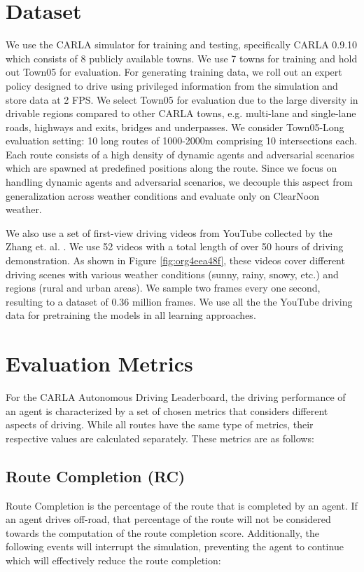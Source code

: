 \documentclass[letterpaper, 12pt]{book}
\theoremstyle{definition}
\theoremstyle{definition}
\theoremstyle{definition}
\theoremstyle{definition}
\theoremstyle{definition}
\begin{document}
\section{Dataset \label{org2f244fb}}
\label{sec:org3dcf138}
We use the CARLA \cite{Dosovitskiy2017} simulator for training and testing,
specifically CARLA 0.9.10 which consists of 8 publicly available towns. We use 7
towns for training and hold out Town05 for evaluation. For generating training
data, we roll out an expert policy designed to drive using privileged
information from the simulation and store data at 2 FPS. We select Town05 for
evaluation due to the large diversity in drivable regions compared to other
CARLA towns, e.g. multi-lane and single-lane roads, highways and exits, bridges
and underpasses. We consider Town05-Long evaluation setting: 10 long routes of
1000-2000m comprising 10 intersections each. Each route consists of a high
density of dynamic agents and adversarial scenarios which are spawned at
predefined positions along the route. Since we focus on handling dynamic agents
and adversarial scenarios, we decouple this aspect from generalization across
weather conditions and evaluate only on ClearNoon weather.

We also use a set of first-view driving videos from YouTube collected by the
Zhang et. al. \cite{Zhang2022}. We use 52 videos with a total length of over 50
hours of driving demonstration. As shown in Figure \ref{fig:org4eea48f}, these videos
cover different driving scenes with various weather conditions (sunny, rainy,
snowy, etc.) and regions (rural and urban areas). We sample two frames every one
second, resulting to a dataset of 0.36 million frames. We use all the the
YouTube driving data for pretraining the models in all learning approaches.

\section{Evaluation Metrics \label{orgbac949a}}
\label{sec:org2fece88}
For the CARLA Autonomous Driving Leaderboard, the driving performance of an
agent is characterized by a set of chosen metrics that considers different
aspects of driving. While all routes have the same type of metrics, their
respective values are calculated separately. These metrics are as follows:

\subsection{Route Completion (RC)}
\label{sec:org73ce085}
Route Completion is the percentage of the route that is completed by an
agent. If an agent drives off-road, that percentage of the route will not be
considered towards the computation of the route completion score. Additionally,
the following events will interrupt the simulation, preventing the agent to
continue which will effectively reduce the route completion:
\end{document}
